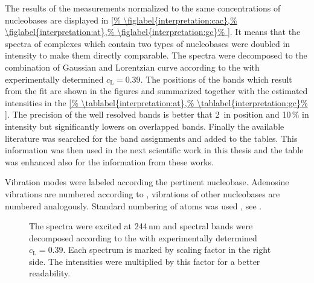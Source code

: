 The results of the measurements normalized to the same concentrations of
nucleobases are displayed in
\cref{%
	\figlabel{interpretation:cac},%
	\figlabel{interpretation:at},%
	\figlabel{interpretation:gc}%
}.
It means that the spectra of complexes which contain two types of nucleobases
were doubled in intensity to make them directly comparable.
The spectra were decomposed to the combination of Gaussian and Lorentzian curve
according to the
with experimentally determined
$c_\text{L} = 0.39$.
The positions of the bands which result from the fit are shown in the figures
and summarized together with the estimated intensities in the
\cref{%
	\tablabel{interpretation:at},%
	\tablabel{interpretation:gc}%
}.
The precision of the well resolved bands is better that 2\,\icm{} in position
and 10\,\% in intensity but significantly lowers on overlapped bands.
Finally the available literature was searched for the band assignments and
added to the tables.
This information was then used in the next scientific work in this thesis and
the table was enhanced also for the information from these works.

Vibration modes were labeled according the pertinent nucleobase.
Adenosine vibrations are numbered according to
\textcite{Toyama1994},
vibrations of other nucleobases are numbered analogously.
Standard numbering of atoms was used
\parencite{Bloomfield1999},
see
.

\begin{figure}
	\centering
	
	\caption[%
		Nucleoside standard atom numbering and Watson-Crick hydrogen bonding.
	]{%
		}
	\label{\figlabel{interpretation:structure}}
\end{figure}

\begin{figure}
	\centering
	
	\caption[%
		Spectrum of cacodylate solvent used for background subtraction with
		244\,nm excitation.
	]{%
		}
	\label{\figlabel{interpretation:cac}}
\end{figure}

\begin{figure}
	\centering
	
	\caption[%
		Spectra of AMP, TMP and poly(dAdT) obtained at 5\,\textdegree{}C and
		95\,\textdegree{}C.
	]{%
		The spectra were excited at 244\,nm and spectral bands were decomposed
		according to the
		with experimentally determined
		$c_\text{L} = 0.39$.
		Each spectrum is marked by scaling factor in the right side.
		The intensities were multiplied by this factor for a better readability.}
	\label{\figlabel{interpretation:at}}
\end{figure}

